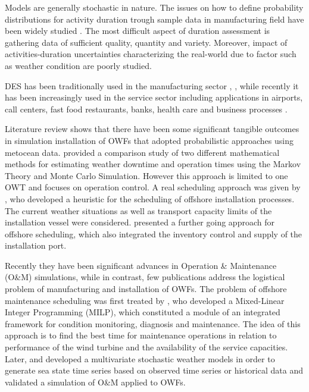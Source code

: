 Models are generally stochastic in nature. The issues on how to define probability distributions for activity duration trough sample data in manufacturing field have been widely studied \cite{fente2000defining, Maio2000}. The most difficult aspect of duration assessment is gathering data of sufficient quality, quantity and variety. Moreover, impact of activities-duration uncertainties characterizing the real-world due to factor such as weather condition are poorly studied.

DES has been traditionally used in the manufacturing sector \cite{KhedriLiraviasl20151490}, \cite{Yeong2014}, while recently it has been increasingly used in the service sector including applications in airports, call centers, fast food restaurants, banks, health care \cite{Chemweno201445} and business processes \cite{Khodyrev2014322}.

Literature review shows that there have been some significant tangible outcomes in simulation installation of OWFs that adopted probabilistic approaches using metocean data. \cite{Tyapin2011} provided a comparison study of two different mathematical methods for estimating weather downtime and operation times using the Markov Theory and Monte Carlo Simulation. However this approach is limited to one OWT and focuses on operation control. A real scheduling approach was given by \cite{Scholz2010}, who developed a heuristic for the scheduling of offshore installation processes. The current weather situations as well as transport capacity limits of the installation vessel were considered. \cite{ISOPE2012} presented a further going approach for offshore scheduling, which also integrated the inventory control and supply of the installation port.

Recently they have been significant advances in Operation \& Maintenance (O\&M) simulations, while in contrast, few publications address the logistical problem of manufacturing and installation of OWFs. The problem of offshore maintenance scheduling was first treated by \cite{Kovacs2011497}, who developed a Mixed-Linear Integer Programming (MILP), which constituted a module of an integrated framework for condition monitoring, diagnosis and maintenance. The idea of this approach is to find the best time for maintenance operations in relation to performance of the wind turbine and the availability of the service capacities. Later, \cite{scheu2012} and \cite{Hagen2013} developed a multivariate stochastic weather models in order to generate sea state time series based on observed time series or historical data and validated a simulation of O\&M applied to OWFs.


